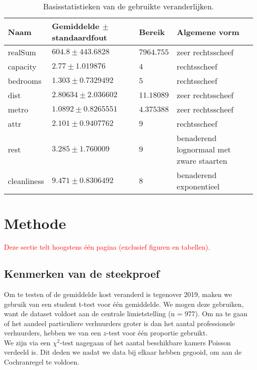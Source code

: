 \documentclass[a4paper]{kulakarticle}
\newcommand{\rood}[1]{\textcolor{red}{#1}}
\begin{document}
\begin{table}[h]
	\centering
	\begin{tabular}{| l| l| l|  p{5cm} |}
		\hline
		Naam & Gemiddelde $\pm$ standaardfout  & Bereik & Algemene vorm\\  [1ex]
		\hline\hline
		realSum & $604.8\pm 443.6828 $ & $7964.755$  &  zeer rechtsscheef\\    [0.5ex]
		\hline
		capacity & $2.77\pm 1.019876$ & $4$  & rechtsscheef \\[0.5ex]
		\hline
		bedrooms & $1.303\pm 0.7329492$ & $5$ & rechtsscheef \\[0.5ex]
		\hline
		dist & $2.80634\pm 2.036602$  & $11.18089$ & zeer rechtsscheef \\  [0.5ex]
		\hline
		metro & $1.0892\pm 0.8265551$ & $4.375388$ & zeer rechtsscheef \\ [0.5ex]
		\hline
		attr & $2.101\pm 0.9407762$ & $9$  & rechtsscheef \\  [0.5ex]
		\hline
		rest & $3.285\pm 1.760009$ & $9$ & benaderend lognormaal met zware staarten \\ [0.5ex]
		\hline
		cleanliness & $9.471\pm 0.8306492$ & $8$ & benaderend exponentieel  \\ [0.5ex]
		\hline
	\end{tabular}
	\caption{Basisstatistieken van de gebruikte veranderlijken.}
	\label{uitreksel}
\end{table}
	
	\section{Methode}
	\rood{Deze sectie telt hoogstens één pagina (exclusief figuren en tabellen).}
	\subsection{Kenmerken van de steekproef}
Om te testen of de gemiddelde kost veranderd is tegenover 2019, maken we gebruik van een student t-test voor één gemiddelde. We mogen deze gebruiken, want de dataset voldoet aan de centrale limietstelling (n = 977). Om na te gaan of het aandeel particuliere verhuurders groter is dan het aantal professionele verhuurders, hebben we van een $z$-test voor één proportie gebruikt.\\
 
 We zijn via een $\chi ^2$-test nagegaan of het aantal beschikbare kamers Poisson verdeeld is. Dit deden we nadat we data bij elkaar hebben gegooid, om aan de Cochranregel te voldoen.
	
\end{document}
